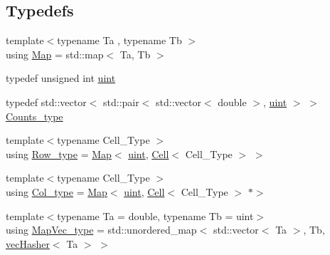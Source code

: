 \subsection*{Typedefs}
\begin{DoxyCompactItemize}
\item 
{\footnotesize template$<$typename Ta , typename Tb $>$ }\\using \hyperlink{namespacebarry_a979a04835a9855ff2054c383c569c89e}{Map} = std\+::map$<$ Ta, Tb $>$
\item 
typedef unsigned int \hyperlink{namespacebarry_a11dfc53ddb4672278319aa04f1e09a6c}{uint}
\item 
typedef std\+::vector$<$ std\+::pair$<$ std\+::vector$<$ double $>$, \hyperlink{namespacebarry_a11dfc53ddb4672278319aa04f1e09a6c}{uint} $>$ $>$ \hyperlink{namespacebarry_a3e2d8c3b6cf602107559d4237d9f1315}{Counts\+\_\+type}
\item 
{\footnotesize template$<$typename Cell\+\_\+\+Type $>$ }\\using \hyperlink{namespacebarry_a741876d7060484e80a9f2b9d128d2c8d}{Row\+\_\+type} = \hyperlink{namespacebarry_a979a04835a9855ff2054c383c569c89e}{Map}$<$ \hyperlink{namespacebarry_a11dfc53ddb4672278319aa04f1e09a6c}{uint}, \hyperlink{classbarry_1_1_cell}{Cell}$<$ Cell\+\_\+\+Type $>$ $>$
\item 
{\footnotesize template$<$typename Cell\+\_\+\+Type $>$ }\\using \hyperlink{namespacebarry_ac328592ccff774bb3614f2cae43cffd7}{Col\+\_\+type} = \hyperlink{namespacebarry_a979a04835a9855ff2054c383c569c89e}{Map}$<$ \hyperlink{namespacebarry_a11dfc53ddb4672278319aa04f1e09a6c}{uint}, \hyperlink{classbarry_1_1_cell}{Cell}$<$ Cell\+\_\+\+Type $>$ $\ast$$>$
\item 
{\footnotesize template$<$typename Ta  = double, typename Tb  = uint$>$ }\\using \hyperlink{namespacebarry_a2f0d3aab1d67e4c8eaeab9022e16139f}{Map\+Vec\+\_\+type} = std\+::unordered\+\_\+map$<$ std\+::vector$<$ Ta $>$, Tb, \hyperlink{structbarry_1_1vec_hasher}{vec\+Hasher}$<$ Ta $>$ $>$
\end{DoxyCompactItemize}
\textbf{ }\par
